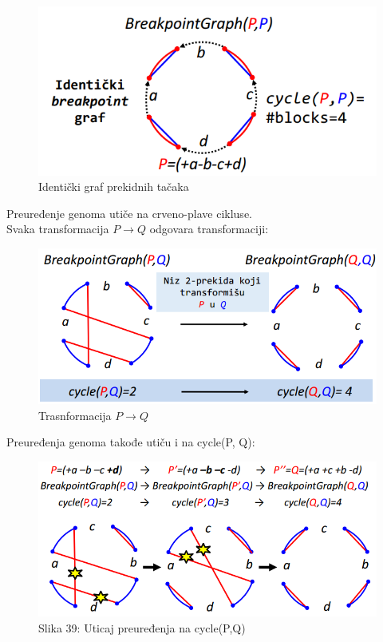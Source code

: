 \begin{figure}[h!]
\centering
\includegraphics[scale=0.6]{poglavlja/6/slike/identicki.PNG}
\caption{Identički graf prekidnih tačaka}
\label{slika:X}
\end{figure}
\newpage
Preuređenje genoma utiče na crveno-plave cikluse.\\

Svaka transformacija $P\rightarrow Q$ odgovara transformaciji:

\begin{figure}[h!]
\centering
\includegraphics[scale=0.7]{poglavlja/6/slike/transfBreakpoint.PNG}
\caption{Trasnformacija $P\rightarrow Q$ }
\label{slika:X}
\end{figure}

 Preuređenja genoma takođe utiču i na cycle(P, Q):

\begin{figure}[h!]
\centering
\includegraphics[scale=0.7]{poglavlja/6/slike/preuredjenja_cycle.PNG}
\caption{Slika 39: Uticaj preuređenja na cycle(P,Q)}
\label{slika:X}
\end{figure}

